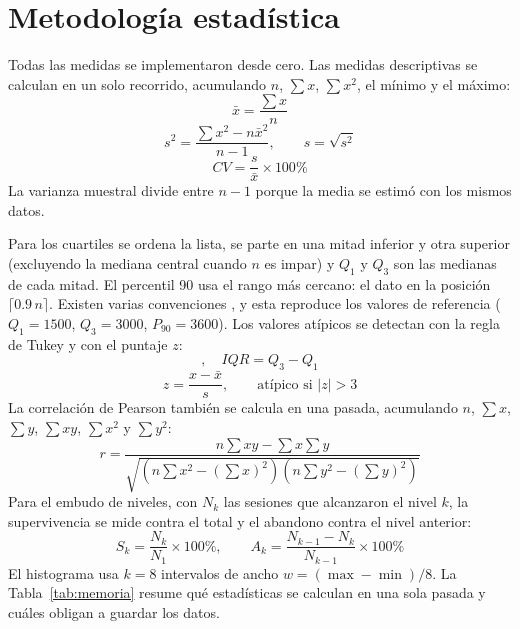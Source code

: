 \documentclass[conference]{IEEEtran}
\begin{document}
\section{Metodología estadística}
Todas las medidas se implementaron desde cero. Las medidas descriptivas se calculan en un solo recorrido, acumulando $n$, $\sum x$, $\sum x^2$, el mínimo y el máximo:
\begin{equation}
\bar{x}=\frac{\sum x}{n}
\end{equation}
\begin{equation}
s^2=\frac{\sum x^2-n\bar{x}^2}{n-1},\qquad s=\sqrt{s^2}
\end{equation}
\begin{equation}
CV=\frac{s}{\bar{x}}\times 100\%
\end{equation}
La varianza muestral divide entre $n-1$ porque la media se estimó con los mismos datos.

Para los cuartiles se ordena la lista, se parte en una mitad inferior y otra superior (excluyendo la mediana central cuando $n$ es impar) y $Q_1$ y $Q_3$ son las medianas de cada mitad. El percentil 90 usa el rango más cercano: el dato en la posición $\lceil 0.9\,n\rceil$. Existen varias convenciones \cite{hyndman}, y esta reproduce los valores de referencia ($Q_1=1500$, $Q_3=3000$, $P_{90}=3600$). Los valores atípicos se detectan con la regla de Tukey \cite{tukey} y con el puntaje $z$:
\begin{equation}
[\,Q_1-1.5\,IQR,\;\; Q_3+1.5\,IQR\,],\quad IQR=Q_3-Q_1
\end{equation}
\begin{equation}
z=\frac{x-\bar{x}}{s},\qquad \text{atípico si } |z|>3
\end{equation}
La correlación de Pearson también se calcula en una pasada, acumulando $n$, $\sum x$, $\sum y$, $\sum xy$, $\sum x^2$ y $\sum y^2$:
\begin{equation}
r=\frac{n\sum xy-\sum x\sum y}{\sqrt{\left(n\sum x^2-(\sum x)^2\right)\left(n\sum y^2-(\sum y)^2\right)}}
\end{equation}
Para el embudo de niveles, con $N_k$ las sesiones que alcanzaron el nivel $k$, la supervivencia se mide contra el total y el abandono contra el nivel anterior:
\begin{equation}
S_k=\frac{N_k}{N_1}\times 100\%,\qquad A_k=\frac{N_{k-1}-N_k}{N_{k-1}}\times 100\%
\end{equation}
El histograma usa $k=8$ intervalos de ancho $w=(\max-\min)/8$. La Tabla~\ref{tab:memoria} resume qué estadísticas se calculan en una sola pasada y cuáles obligan a guardar los datos.
\end{document}
